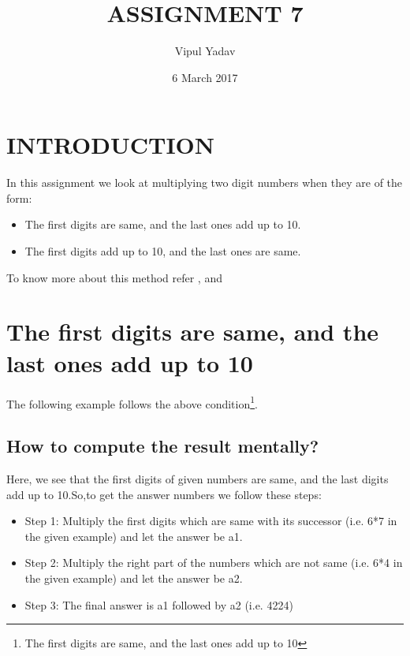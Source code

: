 \documentclass{article}
\title{ASSIGNMENT 7}
\author{Vipul Yadav}
\date{6 March 2017}
\begin{document}
\maketitle

\section{INTRODUCTION}
\label{sec1}

In this assignment we look at multiplying two digit numbers when they are of the form:
\begin{itemize}[leftmargin=\dimexpr\parindent+0\relax]
     \item The first digits are same, and the last ones add up to 10.
     \item The first digits add up to 10, and the last ones are same.
\end{itemize}
To know more about this method refer \cite{vedic}, \cite{florentinwebsite} and \cite{commentry}

\section{The first digits are same, and the last ones add up to 10}
\label{sec2}
The following example follows the above condition\footnote{The first digits are same, and the last ones add up to 10}.

\subsection{How to compute the result mentally?}
\label{subsec1}

Here, we see that the first digits of given numbers are same, and the last digits add up to 10.So,to get the answer numbers we follow these steps:
\begin{itemize}[leftmargin=\dimexpr\parindent+0\relax]
     \item Step 1: Multiply the first digits which are same with its successor (i.e. 6*7 in the given example) and let the answer be a1.
     \item Step 2: Multiply the right part of the numbers which are not same (i.e. 6*4 in the given example) and let the answer be a2.
     \item Step 3: The final answer is a1 followed by a2 (i.e. 4224)
\end{itemize}
\end{document}
